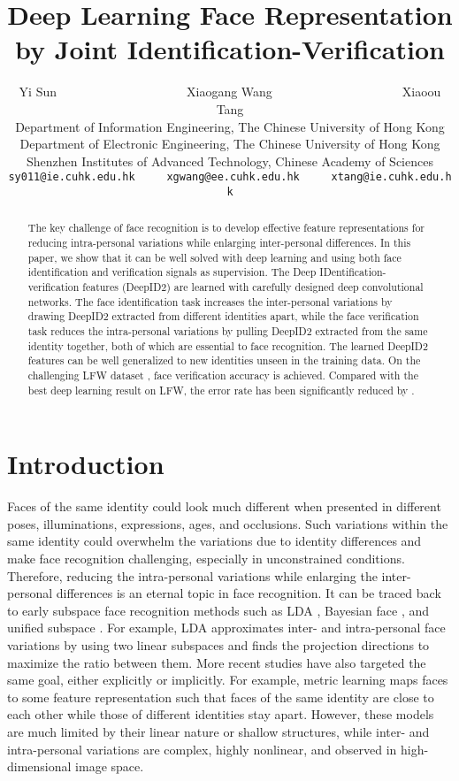 \documentclass{article} \usepackage{nips14submit_e,times}
\title{Deep Learning Face Representation by Joint Identification-Verification}
\author{Yi Sun~~~~~~~~~~~~~~~~~~~~~Xiaogang Wang~~~~~~~~~~~~~~~~~~~~~Xiaoou Tang\\
{\small Department of Information Engineering, The Chinese University of Hong Kong}\\
{\small Department of Electronic Engineering, The Chinese University of Hong Kong}\\
{\small Shenzhen Institutes of Advanced Technology, Chinese Academy of Sciences}\\
{\tt\small sy011@ie.cuhk.edu.hk~~~~~xgwang@ee.cuhk.edu.hk~~~~~xtang@ie.cuhk.edu.hk}
}
\begin{document}
\maketitle

\begin{abstract}
The key challenge of face recognition is to develop effective feature representations for reducing intra-personal variations while enlarging inter-personal differences. In this paper, we show that it can be well solved with deep learning and using both face identification and verification signals as supervision. The Deep IDentification-verification features (DeepID2) are learned with carefully designed deep convolutional networks. The face identification task increases the inter-personal variations by drawing DeepID2 extracted from different identities apart, while the face verification task reduces the intra-personal variations by pulling DeepID2 extracted from the same identity together, both of which are essential to face recognition. The learned DeepID2 features can be well generalized to new identities unseen in the training data. On the challenging LFW dataset \cite{huang2007},  face verification accuracy is achieved. Compared with the best deep learning result \cite{sun2014} on LFW, the error rate has been significantly reduced by .
\end{abstract}


\section{Introduction}

Faces of the same identity could look much different when presented in different poses, illuminations, expressions, ages, and occlusions. Such variations within the same identity could overwhelm the variations due to identity differences and make face recognition challenging, especially in unconstrained conditions. Therefore, reducing the intra-personal variations while enlarging the inter-personal differences is an eternal topic in face recognition. It can be traced back to early subspace face recognition methods such as LDA \cite{belhumeur1997}, Bayesian face \cite{moghaddam2000}, and unified subspace \cite{wang2003,wang2004a}. For example, LDA approximates inter- and intra-personal face variations by using two linear subspaces and finds the projection directions to maximize the ratio between them. More recent studies have also targeted the same goal, either explicitly or implicitly. For example, metric learning \cite{guillaumin2009,huang2011,mignon2012} maps faces to some feature representation such that faces of the same identity are close to each other while those of different identities stay apart. However, these models are much limited by their linear nature or shallow structures, while inter- and intra-personal variations are complex, highly nonlinear, and observed in high-dimensional image space.
\end{document}
